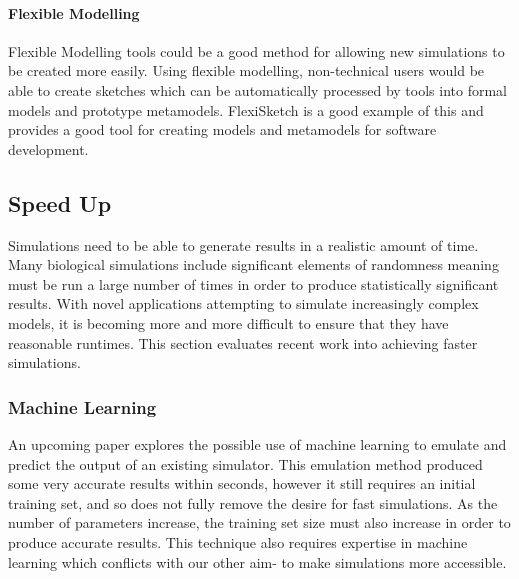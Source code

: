 \documentclass{UoYCSproject}
\begin{document}

\paragraph{Flexible Modelling}
Flexible Modelling tools could be a good method for allowing new simulations to be created more easily.
Using flexible modelling, non-technical users would be able to create sketches which can be automatically processed by tools into formal models and prototype metamodels\cite{Paige2017}.
FlexiSketch is a good example of this and provides a good tool for creating models and metamodels for software development\cite{flexisketch}.

\subsection{Speed Up}
Simulations need to be able to generate results in a realistic amount of time.
Many biological simulations include significant elements of randomness meaning must be run a large number of times in order to produce statistically significant results\cite{spartan}.
With novel applications attempting to simulate increasingly complex models, it is becoming more and more difficult to ensure that they have reasonable runtimes.
This section evaluates recent work into achieving faster simulations.

\subsubsection{Machine Learning}
An upcoming paper explores the possible use of machine learning to emulate and predict the output of an existing simulator\cite{kieran_machine_learning}.
This emulation method produced some very accurate results within seconds, however it still requires an initial training set, and so does not fully remove the desire for fast simulations.
As the number of parameters increase, the training set size must also increase in order to produce accurate results.
This technique also requires expertise in machine learning which conflicts with our other aim- to make simulations more accessible.
\end{document}
